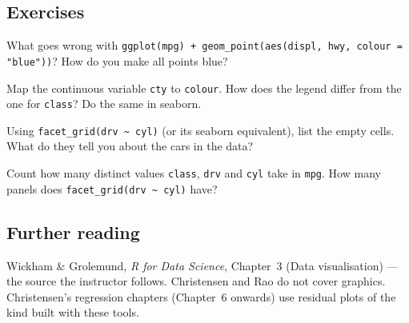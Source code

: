 \subsection{Exercises}
\begin{problem}\label{prob:L02-1}
What goes wrong with \texttt{ggplot(mpg) + geom\_point(aes(displ, hwy, colour = "blue"))}? How do you make all points blue?
\end{problem}
\begin{problem}\label{prob:L02-2}
Map the continuous variable \texttt{cty} to \texttt{colour}. How does the legend differ from the one for \texttt{class}? Do the same in seaborn.
\end{problem}
\begin{problem}\label{prob:L02-3}
Using \texttt{facet\_grid(drv \textasciitilde\ cyl)} (or its seaborn equivalent), list the empty cells. What do they tell you about the cars in the data?
\end{problem}
\begin{problem}\label{prob:L02-4}
Count how many distinct values \texttt{class}, \texttt{drv} and \texttt{cyl} take in \texttt{mpg}. How many panels does \texttt{facet\_grid(drv \textasciitilde\ cyl)} have?
\end{problem}

\subsection{Further reading}
Wickham \& Grolemund, \emph{R for Data Science}, Chapter~3 (Data visualisation) --- the source
the instructor follows. Christensen and Rao do not cover graphics. Christensen's regression
chapters (Chapter~6 onwards) use residual plots of the kind built with these tools.
